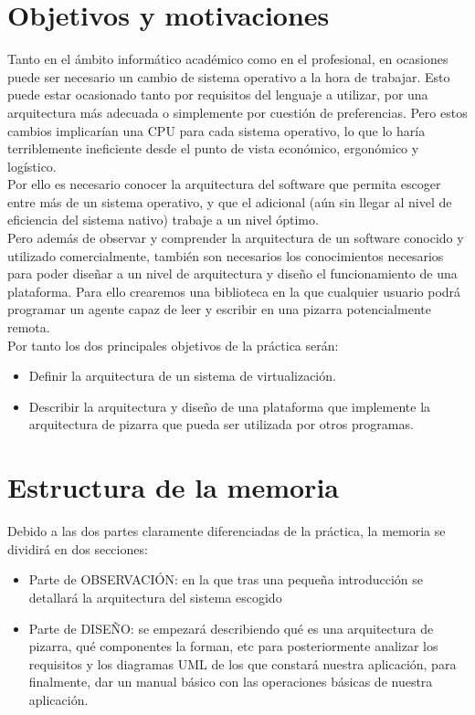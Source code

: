 \section*{Objetivos y motivaciones}
Tanto en el ámbito informático académico como en el profesional, en ocasiones puede ser necesario un cambio de sistema operativo a la hora de trabajar. Esto puede estar ocasionado tanto por requisitos del lenguaje a utilizar, por una arquitectura más adecuada o simplemente por cuestión de preferencias. Pero estos cambios implicarían una CPU para cada sistema operativo, lo que lo haría terriblemente ineficiente desde el punto de vista económico, ergonómico y logístico. \\
Por ello es necesario conocer la arquitectura del software que permita escoger entre más de un sistema operativo, y que el adicional (aún sin llegar al nivel de eficiencia del sistema nativo) trabaje a un nivel óptimo.\\
Pero además de observar y comprender la arquitectura de un software conocido y utilizado comercialmente, también son necesarios los conocimientos necesarios para poder diseñar a un nivel de arquitectura y diseño el funcionamiento de una plataforma. Para ello crearemos una biblioteca en la que cualquier usuario podrá programar un agente capaz de leer y escribir en una pizarra potencialmente remota.\\
Por tanto los dos principales objetivos de la práctica serán:
\begin{itemize}
\item Definir la arquitectura de un sistema de virtualización.
\item Describir la arquitectura y diseño de una plataforma que implemente la arquitectura de pizarra que pueda ser utilizada por otros programas.
\end{itemize}

\section*{Estructura de la memoria}
Debido a las dos partes claramente diferenciadas de la práctica, la memoria se dividirá en dos secciones:
\begin{itemize}
\item Parte de OBSERVACIÓN: en la que tras una pequeña introducción se detallará la arquitectura del sistema escogido
\item Parte de DISEÑO: se empezará describiendo qué es una arquitectura de pizarra, qué componentes la forman, etc para posteriormente analizar los requisitos y los diagramas UML de los que constará nuestra aplicación, para finalmente, dar un manual básico con las operaciones básicas de nuestra aplicación. 
\end{itemize}

